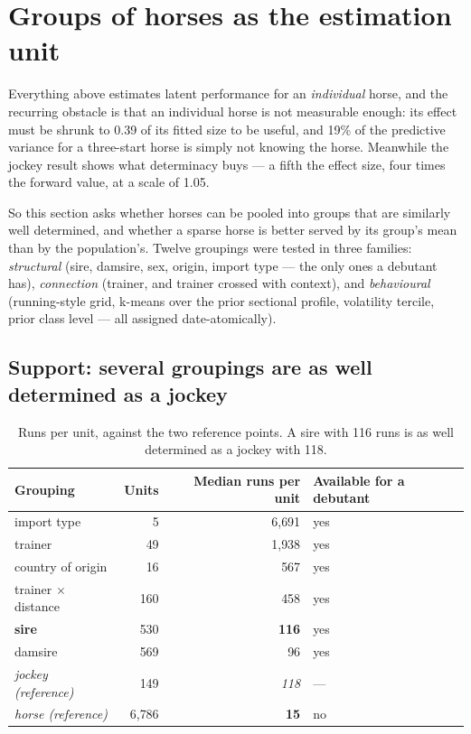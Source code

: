 \documentclass[11pt,a4paper]{article}
\newcommand{\bad}[1]{\textcolor{warm}{\textbf{#1}}}
\begin{document}
\newpage
\section{Groups of horses as the estimation unit}\label{sec:groups}

Everything above estimates latent performance for an \emph{individual} horse, and
the recurring obstacle is that an individual horse is not measurable enough: its
effect must be shrunk to 0.39 of its fitted size to be useful, and 19\% of the
predictive variance for a three-start horse is simply not knowing the horse.
Meanwhile the jockey result shows what determinacy buys --- a fifth the effect
size, four times the forward value, at a scale of 1.05.

So this section asks whether horses can be pooled into groups that are similarly
well determined, and whether a sparse horse is better served by its group's mean
than by the population's. Twelve groupings were tested in three families:
\emph{structural} (sire, damsire, sex, origin, import type --- the only ones a
debutant has), \emph{connection} (trainer, and trainer crossed with context), and
\emph{behavioural} (running-style grid, k-means over the prior sectional profile,
volatility tercile, prior class level --- all assigned date-atomically).

\subsection{Support: several groupings are as well determined as a jockey}

\begin{table}[htbp]\centering\small
\caption{Runs per unit, against the two reference points. A sire with 116 runs is
as well determined as a jockey with 118.}
\begin{tabular}{lrrl}
\toprule
Grouping & Units & Median runs per unit & Available for a debutant\\
\midrule
import type & 5 & 6{,}691 & yes\\
trainer & 49 & 1{,}938 & yes\\
country of origin & 16 & 567 & yes\\
trainer $\times$ distance & 160 & 458 & yes\\
\textbf{sire} & 530 & \textbf{116} & yes\\
damsire & 569 & 96 & yes\\
\midrule
\emph{jockey (reference)} & 149 & \emph{118} & ---\\
\emph{horse (reference)} & 6{,}786 & \bad{15} & no\\
\bottomrule
\end{tabular}
\end{table}
\end{document}
